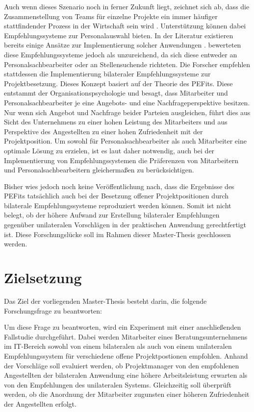 Auch wenn dieses Szenario noch in ferner Zukunft liegt, zeichnet sich ab, dass die Zusammenstellung von Teams für einzelne Projekte ein immer häufiger stattfindender Prozess in der Wirtschaft sein wird \cite[S. 2]{malinowski:2008}. Unterstützung können dabei Empfehlungssysteme zur Personalauswahl bieten. In der Literatur existieren bereits einige Ansätze zur Implementierung solcher Anwendungen \cite{malinowski:2008}. \textcite{malinowski:2008} bewerteten diese Empfehlungssysteme jedoch als unzureichend, da sich diese entweder an Personalsachbearbeiter oder an Stellensuchende richteten. Die Forscher empfehlen stattdessen die Implementierung bilateraler Empfehlungssysteme zur Projektbesetzung. Dieses Konzept basiert auf der Theorie des \acp{PEFit}. Diese entstammt der Organisationspsychologie und besagt, dass Mitarbeiter und Personalsachbearbeiter je eine Angebots- und eine Nachfrageperspektive besitzen. Nur wenn sich Angebot und Nachfrage beider Parteien ausgleichen, führt dies aus Sicht des Unternehmens zu einer hohen Leistung des Mitarbeiters und aus Perspektive des Angestellten zu einer hohen Zufriedenheit mit der Projektposition. Um sowohl für Personalsachbearbeiter als auch Mitarbeiter eine optimale Lösung zu erzielen, ist es laut \textcite{malinowski:2008} daher notwendig, auch bei der Implementierung von Empfehlungssystemen die Präferenzen von Mitarbeitern und Personalsachbearbeitern gleichermaßen zu berücksichtigen.

Bisher wies jedoch noch keine Veröffentlichung nach, dass die Ergebnisse des \acp{PEFit} tatsächlich auch bei der Besetzung offener Projektpositionen durch bilaterale Empfehlungssysteme reproduziert werden können. Somit ist nicht belegt, ob der höhere Aufwand zur Erstellung bilateraler Empfehlungen gegenüber unilateralen Vorschlägen in der praktischen Anwendung gerechtfertigt ist. Diese Forschungslücke soll im Rahmen dieser Master-Thesis geschlossen werden.

\section{Zielsetzung}
\label{sec:intro:zielsetzung}
Das Ziel der vorliegenden Master-Thesis besteht darin, die folgende Forschungsfrage zu beantworten:

\forschungsfrage

Um diese Frage zu beantworten, wird ein Experiment mit einer anschließenden Fallstudie durchgeführt. Dabei werden Mitarbeiter eines Beratungsunternehmens im IT-Bereich sowohl von einem bilateralen als auch von einem unilateralen Empfehlungssystem für verschiedene offene Projektpostionen empfohlen. Anhand der Vorschläge soll evaluiert werden, ob Projektmanager von den empfohlenen Angestellten der bilateralen Anwendung eine höhere Arbeitsleistung erwarten als von den Empfehlungen des unilateralen Systems. Gleichzeitig soll überprüft werden, ob die Anordnung der Mitarbeiter zugunsten einer höheren Zufriedenheit der Angestellten erfolgt.

